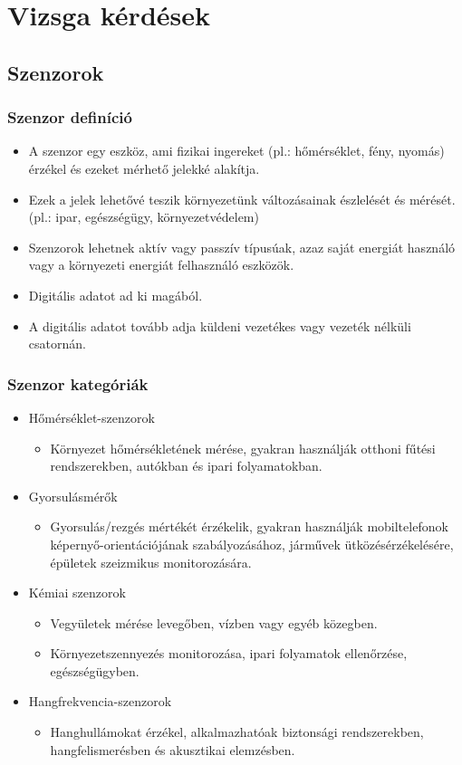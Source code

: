 ﻿\section{Vizsga kérdések}

\subsection{Szenzorok}
\subsubsection{Szenzor definíció}
\begin{itemize}
    \item A szenzor egy eszköz, ami fizikai ingereket (pl.: hőmérséklet, fény, nyomás) érzékel és ezeket mérhető jelekké alakítja.
    \item Ezek a jelek lehetővé teszik környezetünk változásainak észlelését és mérését. (pl.: ipar, egészségügy, környezetvédelem)
    \item Szenzorok lehetnek aktív vagy passzív típusúak, azaz saját energiát használó vagy a környezeti energiát felhasználó eszközök.
    \item Digitális adatot ad ki magából.
    \item A digitális adatot tovább adja küldeni vezetékes vagy vezeték nélküli csatornán.
\end{itemize}

\subsubsection{Szenzor kategóriák}
\begin{itemize}
    \item Hőmérséklet-szenzorok
    \begin{itemize}
        \item Környezet hőmérsékletének mérése, gyakran használják otthoni fűtési rendszerekben, autókban és ipari folyamatokban.
    \end{itemize}
    \item Gyorsulásmérők
    \begin{itemize}
        \item Gyorsulás/rezgés mértékét érzékelik, gyakran használják mobiltelefonok képernyő-orientációjának szabályozásához, járművek ütközésérzékelésére, épületek szeizmikus monitorozására.
    \end{itemize}
    \item Kémiai szenzorok
    \begin{itemize}
        \item Vegyületek mérése levegőben, vízben vagy egyéb közegben.
        \item Környezetszennyezés monitorozása, ipari folyamatok ellenőrzése, egészségügyben.
    \end{itemize}
    \item Hangfrekvencia-szenzorok
    \begin{itemize}
        \item Hanghullámokat érzékel, alkalmazhatóak biztonsági rendszerekben, hangfelismerésben és akusztikai elemzésben.
    \end{itemize}
\end{itemize}

